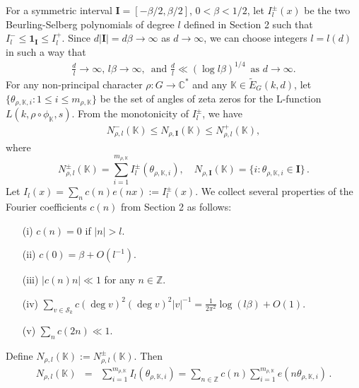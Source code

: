 \documentclass[12pt]{amsart}
\theoremstyle{plain}
\begin{document}
For a symmetric interval ${{\mathbf I}}=[-\beta/2,\beta/2]$, $0<\beta<1/2$, let $I^{\pm}_l(x)$ be the two Beurling-Selberg polynomials of degree $l$ defined in Section 2 such that $I^{-}_l \le \mathbf{1}_{{\mathbf I}} \le I^{+}_l$. Since $d |{{\mathbf I}}|=d \beta \to \infty$ as $d \to \infty$, we can choose integers $l=l(d)$ in such a way that
\begin{eqnarray*} \label{3:K} \frac{d}{l} \to \infty,\, l \beta \to \infty,\, \mbox{ and } \frac{d}{l } \ll \left(\log l\beta \right)^{1/4}  \, \mbox{ as } d \to \infty.\end{eqnarray*}
For any non-principal character $\rho:G \to {{\mathbb C}}^*$ and any ${{\mathbb K}} \in \widetilde{E}_G(k,d)$, let
$\{\theta_{\rho,{{\mathbb K}},i}: 1 \le i \le m_{\rho,{{\mathbb K}}}\} $ be the set of angles of zeta zeros for the L-function $L(k,\rho \circ {\phi_{{\mathbb K}}},s)$. From the monotonicity of $I^{\pm}_l$, we have
\begin{eqnarray*} \label{3:NK} N^{-}_{\rho,l}({{\mathbb K}}) \le N_{\rho,{{\mathbf I}}} ({{\mathbb K}}) \le N^{+}_{\rho,l}({{\mathbb K}}), \end{eqnarray*}
where
\[N^{\pm}_{\rho,l}({{\mathbb K}}) = \sum_{i=1}^{m_{\rho,{{\mathbb K}}}} I^{\pm}_l\left(\theta_{\rho,{{\mathbb K}},i}\right), \quad N_{\rho,{{\mathbf I}}}({{\mathbb K}})=\{i: \theta_{\rho,{{\mathbb K}},i} \in {{\mathbf I}}\}\,. \]
Let $I_l(x)=\sum_{n}c(n)e(nx):=I^{\pm}_l(x)$. We collect several properties of the Fourier coefficients $c(n)$ from Section 2 as follows:
\begin{itemize}
\item[(i)] $c(n)=0$ if $|n|>l$.

\item[(ii)] $c(0)=\beta+O\left(l^{-1}\right)$.

\item[(iii)] $|c(n)n| \ll 1$ for any $n \in {{\mathbb Z}}$.

\item[(iv)] $\sum_{v \in {\mathcal{S}_k}} c(\deg v)^2 (\deg v)^2 |v|^{-1} =\frac{1}{2 \pi^2} \log (l \beta) +O(1)$.
\item[(v)] $\sum_{n} c(2n) \ll 1$.
\end{itemize}
Define $N_{\rho,l}({{\mathbb K}}):=N^{\pm}_{\rho,l}({{\mathbb K}})$. Then
\begin{eqnarray*} N_{\rho,l}({{\mathbb K}})&=&\sum_{i=1}^{m_{\rho,{{\mathbb K}}}}I_{l} \left(\theta_{\rho,{{\mathbb K}},i}\right)=\sum_{n \in {{\mathbb Z}}} c(n) \sum_{i=1}^{m_{\rho,{{\mathbb K}}}} e\left(n \theta_{\rho,{{\mathbb K}},i}\right)\,.\end{eqnarray*}
\end{document}
